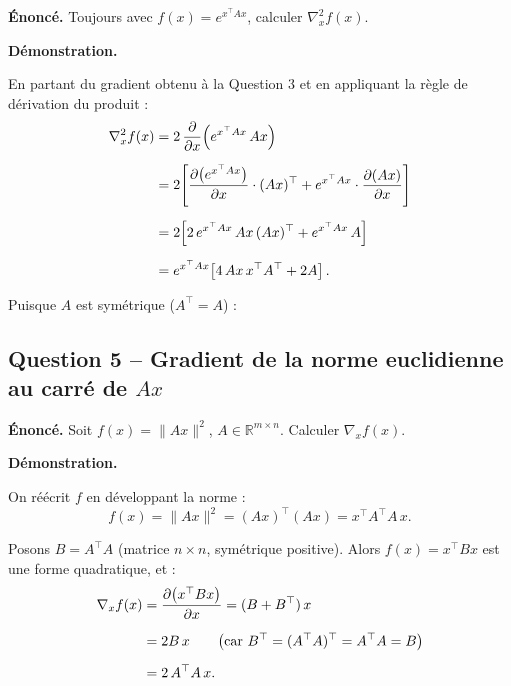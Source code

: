 \documentclass[12pt,a4paper]{article}
\newcommand{\R}{\mathbb{R}}
\newcommand{\grad}{\nabla}
\begin{document}
\textbf{Énoncé.}
Toujours avec $f(x) = e^{x^{\top} A x}$, calculer $\grad_x^2 f(x)$.

\medskip
\textbf{Démonstration.}

En partant du gradient obtenu à la Question 3 et en appliquant la règle de
dérivation du produit :
\begin{align}
  \grad_x^2 f(x)
    &= 2\,\frac{\partial}{\partial x}\!\left(e^{x^{\top} A x}\,Ax\right)
    \notag\\[6pt]
    &= 2\!\left[
         \frac{\partial\bigl(e^{x^{\top} A x}\bigr)}{\partial x}\cdot (Ax)^{\top}
         + e^{x^{\top} A x}\cdot \frac{\partial(Ax)}{\partial x}
       \right] \notag\\[6pt]
    &= 2\!\left[
         2\,e^{x^{\top} A x}\,Ax\,(Ax)^{\top}
         + e^{x^{\top} A x}\,A
       \right] \notag\\[6pt]
    &= e^{x^{\top} A x}\!\left[
         4\,Ax\,x^{\top} A^{\top} + 2A
       \right]. \notag
\end{align}

Puisque $A$ est symétrique ($A^{\top} = A$) :

\medskip
\begin{center}
  \fbox{$\displaystyle
    \grad_x^2 f(x)
    = e^{x^{\top} A x}\!\left(4\,Ax\,x^{\top} A + 2A\right)
  $}
\end{center}

\subsection*{Question 5 -- Gradient de la norme euclidienne au carré de $Ax$}

\textbf{Énoncé.}
Soit $f(x) = \|Ax\|^2$, $A \in \R^{m \times n}$.
Calculer $\grad_x f(x)$.

\medskip
\textbf{Démonstration.}

On réécrit $f$ en développant la norme :
\[
  f(x) = \|Ax\|^2 = (Ax)^{\top}(Ax) = x^{\top} A^{\top} A\, x.
\]

Posons $B = A^{\top} A$ (matrice $n \times n$, symétrique positive). Alors
$f(x) = x^{\top} B x$ est une forme quadratique, et :
\begin{align}
  \grad_x f(x)
    &= \frac{\partial\bigl(x^{\top} B x\bigr)}{\partial x}
     = (B + B^{\top})\,x \notag\\[6pt]
    &= 2B\,x
       \qquad \bigl(\text{car } B^{\top} = (A^{\top}A)^{\top} = A^{\top}A = B\bigr)
    \notag\\[6pt]
    &= 2\,A^{\top} A\, x. \notag
\end{align}
\end{document}
